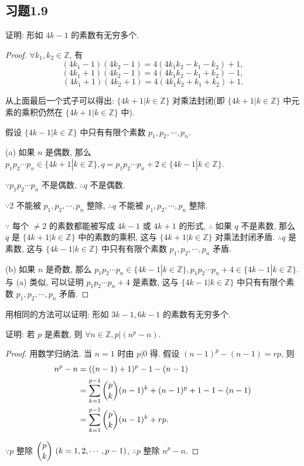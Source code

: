 \documentclass[color=black,device=normal,lang=cn,mode=geye]{elegantnote}
\begin{document}
\subsection{习题1.9}
\begin{exercise}%
    证明: 形如 $4k-1$ 的素数有无穷多个.
\end{exercise}
\begin{proof}
    $\forall k_1,k_2\in\mathbb{Z}$, 有
    \[(4k_1-1)(4k_2-1)=4(4k_1k_2-k_1-k_2)+1,\]
    \[(4k_1+1)(4k_2-1)=4(4k_1k_2-k_1+k_2)-1,\]
    \[(4k_1+1)(4k_2+1)=4(4k_1k_2+k_1+k_2)+1.\]

    从上面最后一个式子可以得出: $\{4k+1|k\in\mathbb{Z}\}$ 对乘法封闭(即 $\{4k+1|k\in\mathbb{Z}\}$ 中元素的乘积仍然在 $\{4k+1|k\in\mathbb{Z}\}$ 中).

    假设 $\{4k-1|k\in\mathbb{Z}\}$ 中只有有限个素数 $p_1,p_2,\cdots,p_n$.
    
    (a) 如果 $n$ 是偶数, 那么 $p_1p_2\cdots p_n\in\{4k+1|k\in\mathbb{Z}\},q=p_1p_2\cdots p_n+2\in\{4k-1|k\in\mathbb{Z}\}$.
    
    $\because p_1p_2\cdots p_n$ 不是偶数, $\therefore q$ 不是偶数.
    
    $\because2$ 不能被 $p_1,p_2,\cdots,p_n$ 整除, $\therefore q$ 不能被 $p_1,p_2,\cdots,p_n$ 整除.

    $\because$ 每个 $\neq2$ 的素数都能被写成 $4k-1$ 或 $4k+1$ 的形式, $\therefore$ 如果 $q$ 不是素数, 那么 $q$ 是 $\{4k+1|k\in\mathbb{Z}\}$ 中的素数的乘积, 这与 $\{4k+1|k\in\mathbb{Z}\}$ 对乘法封闭矛盾. $\therefore q$ 是素数, 这与 $\{4k-1|k\in\mathbb{Z}\}$ 中只有有限个素数 $p_1,p_2,\cdots,p_n$ 矛盾.

    (b) 如果 $n$ 是奇数, 那么 $p_1p_2\cdots p_n\in\{4k-1|k\in\mathbb{Z}\},p_1p_2\cdots p_n+4\in\{4k-1|k\in\mathbb{Z}\}$. 与 (a) 类似, 可以证明 $p_1p_2\cdots p_n+4$ 是素数, 这与 $\{4k-1|k\in\mathbb{Z}\}$ 中只有有限个素数 $p_1,p_2,\cdots,p_n$ 矛盾.
\end{proof}
\begin{note}
    用相同的方法可以证明: 形如 $3k-1,6k-1$ 的素数有无穷多个.
\end{note}
\addtocounter{exercise}{2}
\begin{exercise}%
    证明: 若 $p$ 是素数, 则 $\forall n\in\mathbb{Z},p|(n^p-n)$.
\end{exercise}
\begin{proof}
    用数学归纳法. 当 $n=1$ 时由 $p|0$ 得. 假设 $(n-1)^p-(n-1)=rp$, 则
    \begin{align*}
        n^p-n & =((n-1)+1)^p-1-(n-1) \\
        & =\sum\limits_{k=1}^{p-1}\dbinom{p}{k}(n-1)^k+(n-1)^p+1-1-(n-1) \\
        & =\sum\limits_{k=1}^{p-1}\dbinom{p}{k}(n-1)^k+rp.
    \end{align*}

    $\because p$ 整除 $\dbinom{p}{k}\ (k=1,2,\cdots,p-1)$, $\therefore p$ 整除 $n^p-n$.
\end{proof}
\end{document}
